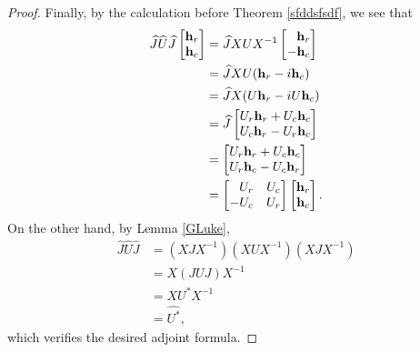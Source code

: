 \documentclass{dis}
\newcommand{\phm}{\phantom{-}}
\theoremstyle{plain}
\theoremstyle{definition}
\renewcommand{\vec}[1]{{\bf #1}}
\newcommand{\0}{{\color{lightgray}0}}
\begin{document}
\begin{proof}
Finally, by the calculation before Theorem \ref{sfddsfsdf}, we see that
\begin{align*}
\widehat{J} \widehat{U} \widehat{J} \begin{bmatrix}\vec{h}_{r}\\ \vec{h}_{c}\end{bmatrix} & = \widehat{J} X U X^{-1} \begin{bmatrix}\phantom{-}\vec{h}_{r} \\ - \vec{h}_{c}\end{bmatrix} \\
& =  \widehat{J} X U (\vec{h}_{r} - i \vec{h}_{c})\\
& =  \widehat{J} X (U \vec{h}_{r} - i U \vec{h}_{c})\\
& = \widehat{J}\begin{bmatrix}U_{r} \vec{h}_{r} + U_{c} \vec{h}_{c}\\ U_{c} \vec{h}_{r} - U_{r} \vec{h}_{c}\end{bmatrix}\\
& = \begin{bmatrix} U_{r} \vec{h}_{r} + U_{c} \vec{h}_{c}\\ U_{r} \vec{h}_{c} - U_{c} \vec{h}_{r}\end{bmatrix}\\
& = \begin{bmatrix}\phm U_{r} & U_{c}\\ -U_{c} & U_{r}\end{bmatrix} \begin{bmatrix} \vec{h}_{r}\\ \vec{h}_{c}\end{bmatrix}.
\end{align*}
On the other hand, by Lemma \ref{GLuke}, 
\begin{align*}
\widehat{J} \widehat{U} \widehat{J}  & = (X J X^{-1})(X U X^{-1})(X J X^{-1})\\
& = X (J U J) X^{-1}\\
& = X U^{*} X^{-1}\\
& = \widehat{U^{*}},
\end{align*}
which verifies the desired adjoint formula.
\end{proof}
\end{document}
